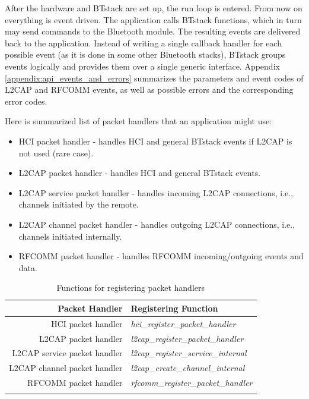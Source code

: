 \documentclass[a4paper,titlepage,oneside,12pt]{amsart} %
\begin{document}
After the hardware and BTstack are set up, the run loop is entered. From now on everything is event driven. The application calls BTstack functions, which in turn may send commands to the Bluetooth module. The resulting events are delivered back to the application. Instead of writing a single callback handler for each possible event (as it is done in some other Bluetooth stacks), BTstack groups events logically and provides them over a single generic interface.  Appendix \ref{appendix:api_events_and_errors} summarizes the parameters and event codes of L2CAP and RFCOMM events, as well as possible errors and the corresponding error codes.

Here is summarized list of packet handlers that an application might use:
\begin{itemize}
\item HCI packet handler - handles HCI and general BTstack events if L2CAP is not used (rare case). 
\item L2CAP packet handler - handles HCI and general BTstack events.
\item L2CAP service packet handler - handles incoming L2CAP connections, i.e., channels initiated by the remote.
\item L2CAP channel packet handler - handles outgoing L2CAP connections,  i.e., channels initiated internally.
\item RFCOMM packet handler - handles RFCOMM  incoming/outgoing events and data.
\end{itemize}

\begin{table}\centering
\caption{Functions for registering packet handlers}
\begin{tabular}{rl}\toprule
Packet Handler & Registering Function\\ 
\midrule
HCI packet handler &  \emph{hci\_register\_packet\_handler}\\
L2CAP packet handler &  \emph{l2cap\_register\_packet\_handler}\\
L2CAP service packet handler & \emph{l2cap\_register\_service\_internal}\\
L2CAP channel packet handler & \emph{l2cap\_create\_channel\_internal}\\
RFCOMM packet handler & \emph{rfcomm\_register\_packet\_handler}\\
\bottomrule
 \label{table:registeringFunction}
 \end{tabular}
\end{table}
\end{document}
